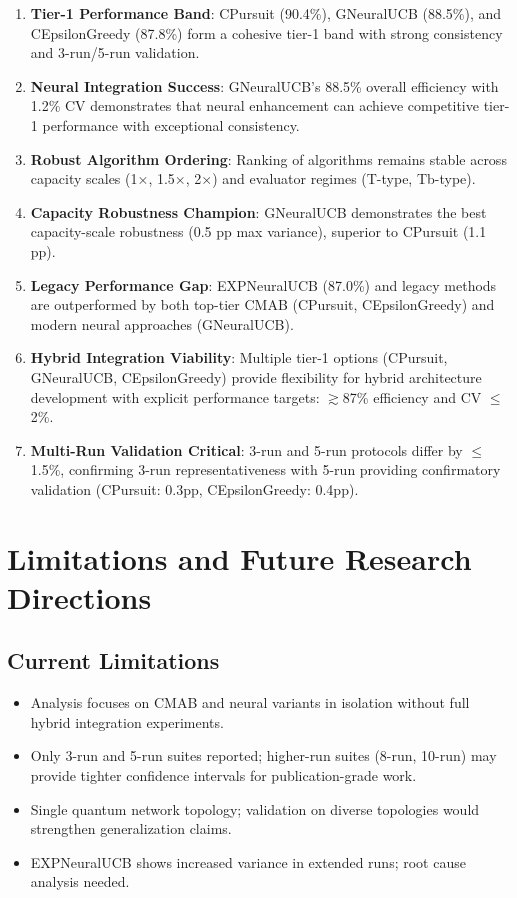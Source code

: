 \documentclass[12pt,a4paper]{article}
\newcommand{\legacy}[1]{\textcolor{legacycolor}{\textbf{#1}}}
\newcommand{\neural}[1]{\textcolor{neuralcolor}{\textbf{#1}}}
\begin{document}
\begin{enumerate}
\item \textbf{Tier-1 Performance Band}: CPursuit (90.4\%), GNeuralUCB (88.5\%), and CEpsilonGreedy (87.8\%) form a cohesive tier-1 band with strong consistency and 3-run/5-run validation.
\item \neural{Neural Integration Success}: GNeuralUCB's 88.5\% overall efficiency with 1.2\% CV demonstrates that neural enhancement can achieve competitive tier-1 performance with exceptional consistency.
\item \textbf{Robust Algorithm Ordering}: Ranking of algorithms remains stable across capacity scales (1$\times$, 1.5$\times$, 2$\times$) and evaluator regimes (T-type, Tb-type).
\item \neural{Capacity Robustness Champion}: GNeuralUCB demonstrates the best capacity-scale robustness (0.5 pp max variance), superior to CPursuit (1.1 pp).
\item \legacy{Legacy Performance Gap}: EXPNeuralUCB (87.0\%) and legacy methods are outperformed by both top-tier CMAB (CPursuit, CEpsilonGreedy) and modern neural approaches (GNeuralUCB).
\item \textbf{Hybrid Integration Viability}: Multiple tier-1 options (CPursuit, GNeuralUCB, CEpsilonGreedy) provide flexibility for hybrid architecture development with explicit performance targets: $\gtrsim$87\% efficiency and CV $\leq$2\%.
\item \textbf{Multi-Run Validation Critical}: 3-run and 5-run protocols differ by $\leq$1.5\%, confirming 3-run representativeness with 5-run providing confirmatory validation (CPursuit: 0.3pp, CEpsilonGreedy: 0.4pp).
\end{enumerate}

\section{Limitations and Future Research Directions}

\subsection{Current Limitations}

\begin{itemize}
\item Analysis focuses on CMAB and neural variants in isolation without full hybrid integration experiments.
\item Only 3-run and 5-run suites reported; higher-run suites (8-run, 10-run) may provide tighter confidence intervals for publication-grade work.
\item Single quantum network topology; validation on diverse topologies would strengthen generalization claims.
\item EXPNeuralUCB shows increased variance in extended runs; root cause analysis needed.
\end{itemize}
\end{document}

